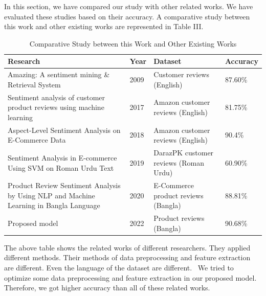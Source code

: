 \documentclass[conference]{IEEEtran}
\begin{document}
In this section, we have compared our study with other related works. We have evaluated these studies based on their accuracy. A comparative study between this work and other existing works are represented in Table III.
\begin{table}[h]
 \caption{Comparative Study between this Work and Other Existing Works}

\renewcommand{\arraystretch}{3} %

    \begin{tabular}{|p{3.5cm}|p{0.8cm}|p{1.5cm}|p{1.5cm}|}
   
    \hline
        \textbf{Research} & \textbf{Year} & \textbf{Dataset} & \textbf{Accuracy} \\ \hline
        

                
        Amazing: A sentiment mining \& Retrieval System\cite{b9} & 2009 & Customer reviews (English)  & 87.60\% \\ \hline
        
        Sentiment analysis of customer product reviews using machine learning\cite{b10} & 2017 & Amazon customer reviews (English)  & 81.75\% \\ \hline
        
        Aspect-Level Sentiment Analysis on E-Commerce Data \cite{b11} & 2018 & Amazon customer reviews (English) & 90.4\% \\ \hline

        Sentiment Analysis in E-commerce Using SVM on Roman Urdu Text\cite{b12} & 2019 & DarazPK customer reviews (Roman Urdu) & 60.90\% \\ \hline
        
        Product Review Sentiment Analysis by Using NLP and Machine Learning in Bangla Language \cite{b13} & 2020 & E-Commerce product reviews (Bangla) & 88.81\% \\ \hline
        


        Proposed model & 2022 & Product reviews (Bangla) & 90.68\% \\ \hline
    \end{tabular}
\end{table}

The above table shows the related works of different researchers. They applied different methods. Their methods of data preprocessing and feature extraction are different. Even the language of the dataset are different.  We tried to optimize some data preprocessing and feature extraction in our proposed model. Therefore, we got higher accuracy than all of these related works. 
\end{document}
